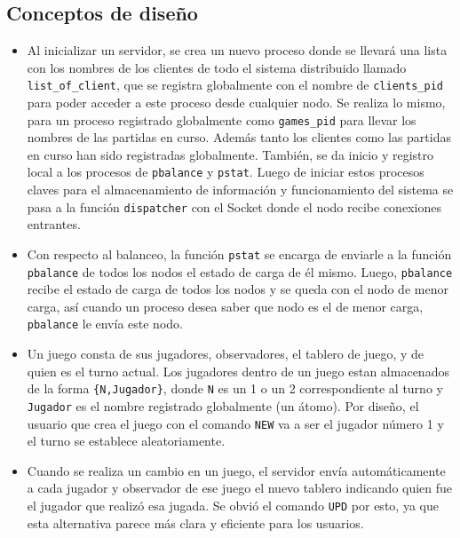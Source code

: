 \documentclass[a4paper]{article}
\newcommand{\blacktr}[0]{\item[$\blacktriangleright$]}
\begin{document}
\subsection*{Conceptos de diseño}
\begin{itemize}
  \blacktr Al inicializar un servidor, se crea un nuevo proceso donde se llevará una lista con los nombres de los clientes de todo el sistema distribuido llamado \texttt{list_of_client}, que se registra globalmente con el nombre de \texttt{clients_pid} para poder acceder a este proceso desde cualquier nodo. Se realiza lo mismo, para un proceso registrado globalmente como \texttt{games_pid} para llevar los nombres de las partidas en curso. Además tanto los clientes como las partidas en curso han sido registradas globalmente. También, se da inicio y registro local a los procesos de \texttt{pbalance} y \texttt{pstat}. Luego de iniciar estos procesos claves para el almacenamiento de información y funcionamiento del sistema se pasa a la función \texttt{dispatcher} con el Socket donde el nodo recibe conexiones entrantes.
  \blacktr Con respecto al balanceo, la función \texttt{pstat} se encarga de enviarle a la función \texttt{pbalance} de todos los nodos el estado de carga de él mismo. Luego, \texttt{pbalance} recibe el estado de carga de todos los nodos y se queda con el nodo de menor carga, así cuando un proceso desea saber que nodo es el de menor carga, \texttt{pbalance} le envía este nodo.
  \blacktr Un juego consta de sus jugadores, observadores, el tablero de juego, y de quien es el turno actual. Los jugadores dentro de un juego estan almacenados de la forma \texttt{\{N,Jugador\}}, donde \texttt{N} es un 1 o un 2 correspondiente al turno y \texttt{Jugador} es el nombre registrado globalmente (un átomo). Por diseño, el usuario que crea el juego con el comando \texttt{NEW} va a ser el jugador número 1 y el turno se establece aleatoriamente.
  \blacktr Cuando se realiza un cambio en un juego, el servidor envía automáticamente a cada jugador y observador de ese juego el nuevo tablero indicando quien fue el jugador que realizó esa jugada. Se obvió el comando \texttt{UPD} por esto, ya que esta alternativa parece más clara y eficiente para los usuarios. 
\end{itemize}
\end{document}
